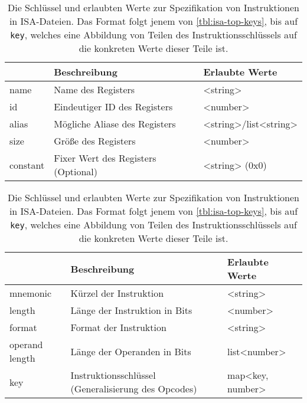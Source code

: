 \begin{table}[p]
  \vspace{0.7cm}

  \begin{tabular}{>{\ttfamily}l p{8.5cm} >{\ttfamily}p{3.5cm}}
    {\normalfont\bfseries Schlüssel} & \textbf{Beschreibung} & \textbf{Erlaubte Werte}\\
    \toprule

    name & Name des Registers & <string>\\

    id & Eindeutiger ID des Registers & <number>\\

    alias & Mögliche Aliase des Registers & <string>/list<string>\\

    size & Größe des Registers & <number> \\

    constant & Fixer Wert des Registers (Optional) & <string> (0x0)
  \end{tabular}
  \caption{Die Schlüssel und erlaubten Werte zur Spezifikation von Registern in ISA-Dateien. Das Format folgt jenem von \autoref{tbl:isa-top-keys}.}
  \label{tbl:isa-reg}

  \vspace{0.7cm}

  \begin{tabular}{>{\ttfamily}l p{8.5cm} >{\ttfamily}p{3.5cm}}
    {\normalfont\bfseries Schlüssel} & \textbf{Beschreibung} & \textbf{Erlaubte Werte}\\
    \toprule
    mnemonic & Kürzel der Instruktion & <string>\\

    length & Länge der Instruktion in Bits & <number>\\

    format & Format der Instruktion & <string> \\

    operand length & Länge der Operanden in Bits & list<number>\\

    key & Instruktionsschlüssel (Generalisierung des Opcodes) & map<key, number>

  \end{tabular}
  \caption{Die Schlüssel und erlaubten Werte zur Spezifikation von Instruktionen in ISA-Dateien. Das Format folgt jenem von \autoref{tbl:isa-top-keys}, bis auf \texttt{key}, welches eine Abbildung von Teilen des Instruktionsschlüssels auf die konkreten Werte dieser Teile ist.}
  \label{tbl:isa-inst}
\end{table}

